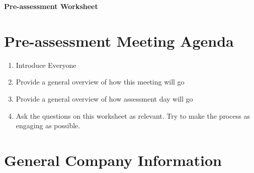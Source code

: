 \documentclass[./main.tex]{subfiles}
\begin{document}
\begin{center}
\Large\textbf{Pre-assessment Worksheet}
\end{center}

\newlength{\answerspace}
\setlength{\answerspace}{2.5cm}  %

\section*{Pre-assessment Meeting Agenda}

\begin{enumerate}
    \item Introduce Everyone
    \item Provide a general overview of how this meeting will go
    \item Provide a general overview of how assessment day will go
    \item Ask the questions on this worksheet as relevant. Try to make the process as engaging as possible.
\end{enumerate}

\section*{General Company Information}
\end{document}
